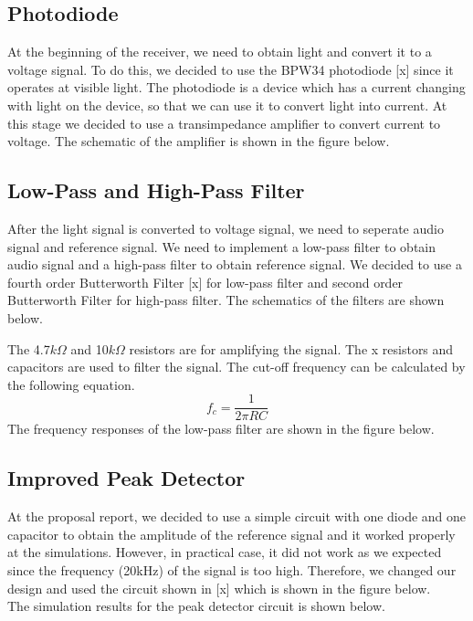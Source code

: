 \documentclass[conference]{IEEEtran}
\begin{document}
\subsection{Photodiode}
At the beginning of the receiver, we need to obtain light and convert it to a voltage signal. To do this, we decided to use the BPW34 photodiode [x] 
since it operates at visible light. The photodiode is a device which has a current changing with light on the device, so that we can use it 
to convert light into current. At this stage we decided to use a transimpedance amplifier to convert current to voltage. The schematic of the amplifier 
is shown in the figure below.


\subsection{Low-Pass and High-Pass Filter}
After the light signal is converted to voltage signal, we need to seperate audio signal and reference signal. We need to implement 
a low-pass filter to obtain audio signal and a high-pass filter to obtain reference signal. We decided to use a fourth order Butterworth 
Filter [x] for low-pass filter and second order Butterworth Filter for high-pass filter. The schematics of the filters are shown below. 


The 4.7\(k\Omega\) and 10\(k\Omega\) resistors are for amplifying the signal. The x resistors and capacitors are used to filter the signal. 
The cut-off frequency can be calculated by the following equation.
\begin{equation}
f_c = \frac{1}{2\pi RC}
\end{equation}  
The frequency responses of the low-pass filter are shown in the figure below.  

\subsection{Improved Peak Detector}
At the proposal report, we decided to use a simple circuit with one diode and one capacitor to obtain the amplitude 
of the reference signal and it worked properly at the simulations. However, in practical case, it did not work as we expected 
since the frequency (20kHz) of the signal is too high. Therefore, we changed our design and used the circuit shown in [x] which is 
shown in the figure below. \\
The simulation results for the peak detector circuit is shown below.
\end{document}

